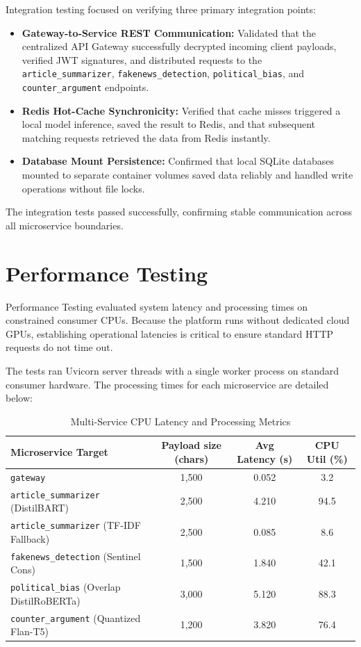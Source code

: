 Integration testing focused on verifying three primary integration points:
\begin{itemize}
    \item \textbf{Gateway-to-Service REST Communication:} Validated that the centralized API Gateway successfully decrypted incoming client payloads, verified JWT signatures, and distributed requests to the \texttt{article\_summarizer}, \texttt{fakenews\_detection}, \texttt{political\_bias}, and \texttt{counter\_argument} endpoints.
    \item \textbf{Redis Hot-Cache Synchronicity:} Verified that cache misses triggered a local model inference, saved the result to Redis, and that subsequent matching requests retrieved the data from Redis instantly.
    \item \textbf{Database Mount Persistence:} Confirmed that local SQLite databases mounted to separate container volumes saved data reliably and handled write operations without file locks.
\end{itemize}
The integration tests passed successfully, confirming stable communication across all microservice boundaries.

\newpage
\section{Performance Testing}
Performance Testing evaluated system latency and processing times on constrained consumer CPUs. Because the platform runs without dedicated cloud GPUs, establishing operational latencies is critical to ensure standard HTTP requests do not time out.

The tests ran Uvicorn server threads with a single worker process on standard consumer hardware. The processing times for each microservice are detailed below:
\begin{table}[h!]
    \centering
    \renewcommand{\arraystretch}{1.3}
    \begin{tabular}{|l|c|c|c|}
        \hline
        \textbf{Microservice Target} & \textbf{Payload size (chars)} & \textbf{Avg Latency (s)} & \textbf{CPU Util (\%)} \\
        \hline
        \texttt{gateway} & 1,500 & 0.052 & 3.2 \\
        \hline
        \texttt{article\_summarizer} (DistilBART) & 2,500 & 4.210 & 94.5 \\
        \hline
        \texttt{article\_summarizer} (TF-IDF Fallback) & 2,500 & 0.085 & 8.6 \\
        \hline
        \texttt{fakenews\_detection} (Sentinel Cons) & 1,500 & 1.840 & 42.1 \\
        \hline
        \texttt{political\_bias} (Overlap DistilRoBERTa) & 3,000 & 5.120 & 88.3 \\
        \hline
        \texttt{counter\_argument} (Quantized Flan-T5) & 1,200 & 3.820 & 76.4 \\
        \hline
    \end{tabular}
    \caption{Multi-Service CPU Latency and Processing Metrics}
    \label{tab:performance_latencies}
\end{table}

